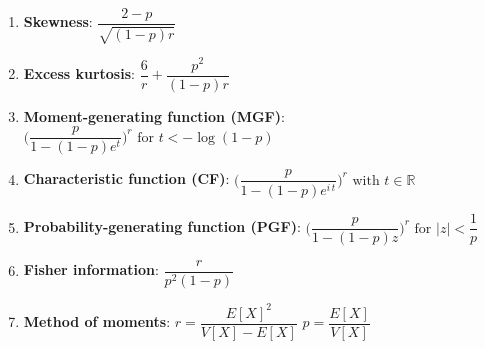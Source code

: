 \begin{enumerate}

    \item \textbf{Skewness}:
    $
         {\displaystyle {\dfrac {2-p}{\sqrt {(1-p)r}}}}
    $
    \hfill \cite{wiki/Negative_binomial_distribution}

    \item \textbf{Excess kurtosis}:
    $
         {\displaystyle {\dfrac {6}{r}}+{\dfrac {p^{2}}{(1-p)r}}}
    $
    \hfill \cite{wiki/Negative_binomial_distribution}


    \item \textbf{Moment-generating function (MGF)}:
    $
         {\displaystyle {\biggl (}{\dfrac {p}{1-(1-p)e^{t}}}{\biggr )}^{\!r}{\text{ for }}t<-\log(1-p)}
    $
    \hfill \cite{wiki/Negative_binomial_distribution}

    \item \textbf{Characteristic function (CF)}:
    $
         {\displaystyle {\biggl (}{\dfrac {p}{1-(1-p)e^{i\,t}}}{\biggr )}^{\!r}{\text{ with }}t\in \mathbb {R} }
    $
    \hfill \cite{wiki/Negative_binomial_distribution}

    \item \textbf{Probability-generating function (PGF)}:
    $
         {\displaystyle {\biggl (}{\dfrac {p}{1-(1-p)z}}{\biggr )}^{\!r}{\text{ for }}|z|<{\dfrac {1}{p}}}
    $
    \hfill \cite{wiki/Negative_binomial_distribution}

    \item \textbf{Fisher information}:
    $
         {\displaystyle {\dfrac {r}{p^{2}(1-p)}}}
    $
    \hfill \cite{wiki/Negative_binomial_distribution}

    \item \textbf{Method of moments}:
    $ {\displaystyle r={\dfrac {E[X]^{2}}{V[X]-E[X]}}}$
    \hspace{1cm}
    $ {\displaystyle p={\dfrac {E[X]}{V[X]}}}$
    \hfill \cite{wiki/Negative_binomial_distribution}
\end{enumerate}







